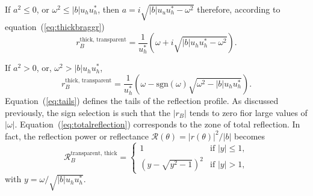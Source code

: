 \documentclass[preprint]{iucr}              %
\begin{document}
If $a^2\le0$, or $\omega^2 \le |b|u_h u_h^*$, then $a=i\sqrt{|b|u_u u_h^* - \omega^2}$ therefore, according to equation~(\ref{eq:thickbraggr})
\begin{equation}\label{eq:totalreflection}
    r_B^{\text{thick, transparent}} =
    \frac{1}{u_{h}^*}\left( \omega+i\sqrt{|b|u_h u_h^*-\omega^2} \right).
\end{equation}

If $a^2 > 0$, or, $\omega^2 > |b|u_h u_h^*$,
\begin{equation}\label{eq:tails}
    r_B^{\text{thick, transparent}} =
    \frac{1}{u_{h}^*}\left( \omega-\text{sgn}(\omega)\sqrt{\omega^2-|b|u_h u_h^*} \right).
\end{equation}
Equation~(\ref{eq:tails}) defines the tails of the reflection profile. As discussed previously, the sign selection is such that the $|r_B|$ tends to zero fior large values of $|\omega|$. Equation~(\ref{eq:totalreflection}) corresponds to the zone of total reflection. In fact, the reflection power or reflectance $\mathcal{R} (\theta)=|r(\theta)|^2 / |b|$ becomes
\begin{equation}\label{eq:Darwin}
\mathcal{R}_B^{\text{transparent, thick}} =
    \begin{cases} 
    1
    & \text{if  $|y| \le 1$},\\
    ( y - \sqrt{y^2-1} )^2
    & \text{if $|y|>1$},
    \end{cases}
\end{equation}
with $y=\omega/\sqrt{|b|u_h u_h^*}$. 



\end{document}
